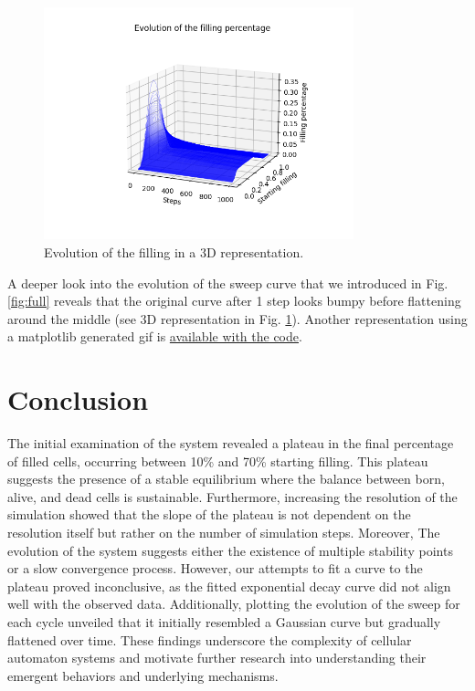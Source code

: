\documentclass{article}
\begin{document}
\begin{figure}[htbp]
    \centering
    \includegraphics[width=0.8\textwidth]{res/evolution_filling.png}
    \caption{Evolution of the filling in a 3D representation.}
    \label{fig:evolution_filling}
\end{figure}

A deeper look into the evolution of the sweep curve that we introduced in Fig. \ref*{fig:full}
reveals that the original curve after 1 step looks bumpy before flattening around the middle 
(see 3D representation in Fig. \ref*{fig:evolution_filling}).
Another representation using a matplotlib generated gif is \href{https://github.com/lele394/DynamicalSystem---Game-Of-Life/blob/main/article/res/animation.gif}{available with the code}.

\section*{Conclusion}

The initial examination of the system revealed a plateau in the final percentage of filled 
cells, occurring between 10\% and 70\% starting filling. This plateau suggests the presence 
of a stable equilibrium where the balance between born, alive, and dead cells is sustainable.
Furthermore, increasing the resolution of the simulation showed that the slope of the 
plateau is not dependent on the resolution itself but rather on the number of simulation 
steps. Moreover, The evolution of the system suggests either the existence of multiple 
stability points or a slow convergence process. However, our attempts to fit a curve to 
the plateau proved inconclusive, as the fitted exponential decay curve did not align well 
with the observed data. Additionally, plotting the evolution of the sweep for each cycle 
unveiled that it initially resembled a Gaussian curve but gradually flattened over time. 
These findings underscore the complexity of cellular automaton systems and motivate further 
research into understanding their emergent behaviors and underlying mechanisms.
\end{document}
